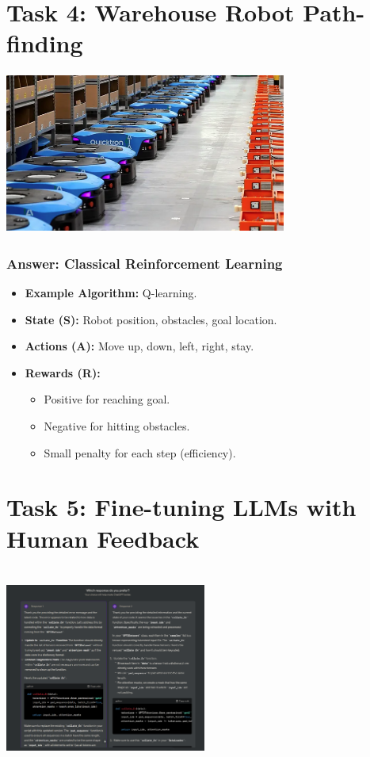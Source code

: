 \documentclass[
  letterpaper,
  DIV=11,
  numbers=noendperiod]{scrreprt}
\providecommand{\tightlist}{%
  \setlength{\itemsep}{0pt}\setlength{\parskip}{0pt}}\usepackage{longtable,booktabs,array}
\begin{document}
\section{Task 4: Warehouse Robot
Path-finding}\label{task-4-warehouse-robot-path-finding}

\includegraphics[width=3.64583in,height=2.08333in]{lecture12/images/ClassicalReinforcementLearning.png}

\subsubsection{Answer: Classical Reinforcement
Learning}\label{answer-classical-reinforcement-learning}

\begin{itemize}
\tightlist
\item
  \textbf{Example Algorithm:} Q-learning.
\item
  \textbf{State (S):} Robot position, obstacles, goal location.
\item
  \textbf{Actions (A):} Move up, down, left, right, stay.
\item
  \textbf{Rewards (R):}

  \begin{itemize}
  \tightlist
  \item
    Positive for reaching goal.
  \item
    Negative for hitting obstacles.
  \item
    Small penalty for each step (efficiency).
  \end{itemize}
\end{itemize}

\section{Task 5: Fine-tuning LLMs with Human
Feedback}\label{task-5-fine-tuning-llms-with-human-feedback}

\includegraphics[width=2.60417in,height=2.60417in]{lecture12/images/DeepReinforcementLearning.png}
\end{document}
